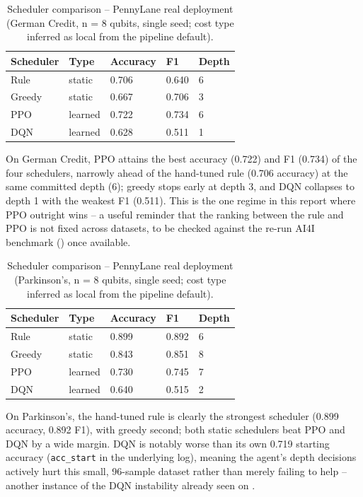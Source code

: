 \begin{table}[htbp]
\centering
\caption{Scheduler comparison -- PennyLane real deployment (German Credit, n = 8 qubits, single seed; cost type inferred as local from the pipeline default).}
\label{tab:german}
\begin{tabular}{|p{3cm}|p{2cm}|p{2.3cm}|p{2cm}|p{2.5cm}|}
\hline
\textbf{Scheduler} & \textbf{Type} & \textbf{Accuracy} & \textbf{F1} & \textbf{Depth} \\
\hline
Rule & static & 0.706 & 0.640 & 6 \\
Greedy & static & 0.667 & 0.706 & 3 \\
PPO & learned & 0.722 & 0.734 & 6 \\
DQN & learned & 0.628 & 0.511 & 1 \\
\hline
\end{tabular}
\end{table}

On German Credit, PPO attains the best accuracy (0.722) and F1 (0.734) of the four schedulers, narrowly ahead of the hand-tuned rule (0.706 accuracy) at the same committed depth (6); greedy stops early at depth 3, and DQN collapses to depth 1 with the weakest F1 (0.511). This is the one regime in this report where PPO outright wins -- a useful reminder that the ranking between the rule and PPO is not fixed across datasets, to be checked against the re-run AI4I benchmark () once available.

\begin{table}[htbp]
\centering
\caption{Scheduler comparison -- PennyLane real deployment (Parkinson's, n = 8 qubits, single seed; cost type inferred as local from the pipeline default).}
\label{tab:parkinsons}
\begin{tabular}{|p{3cm}|p{2cm}|p{2.3cm}|p{2cm}|p{2.5cm}|}
\hline
\textbf{Scheduler} & \textbf{Type} & \textbf{Accuracy} & \textbf{F1} & \textbf{Depth} \\
\hline
Rule & static & 0.899 & 0.892 & 6 \\
Greedy & static & 0.843 & 0.851 & 8 \\
PPO & learned & 0.730 & 0.745 & 7 \\
DQN & learned & 0.640 & 0.515 & 2 \\
\hline
\end{tabular}
\end{table}

On Parkinson's, the hand-tuned rule is clearly the strongest scheduler (0.899 accuracy, 0.892 F1), with greedy second; both static schedulers beat PPO and DQN by a wide margin. DQN is notably worse than its own 0.719 starting accuracy (\texttt{acc\_start} in the underlying log), meaning the agent's depth decisions actively hurt this small, 96-sample dataset rather than merely failing to help -- another instance of the DQN instability already seen on .

